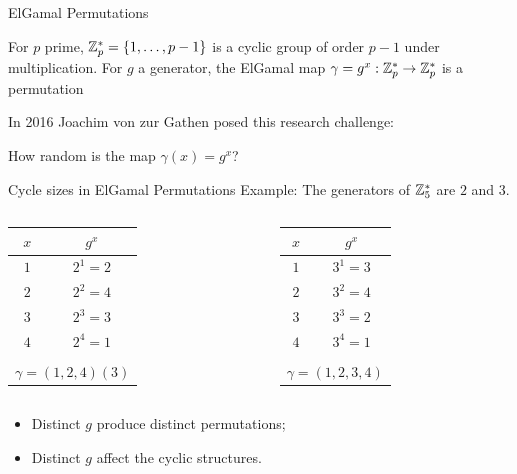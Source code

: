 

\begin{frame}{ElGamal Permutations}

For $p$ prime, $\mathbb{Z}_p^* = \{1, \ldots, p-1\}$ is a cyclic group of order $p-1$ under multiplication. For $g$ a generator, the ElGamal map $\gamma = g^x: \mathbb{Z}_p^* \rightarrow \mathbb{Z}_p^*$ is a permutation
\vspace{1cm}

In 2016 Joachim von zur Gathen posed this research challenge:

\begin{center}
  {\Large
How random is the map $\gamma(x) = g^x$?}
\end{center}

\end{frame}




\begin{frame}{Cycle sizes in ElGamal Permutations}
Example: The generators of $\mathbb{Z}_5^*$ are  $2$ and $3$.

    \begin{columns}
        \begin{column}{0.45\textwidth}
        \centering
    	    \begin{tabular}{c|c}
    	        $x$ & $g^{x} $ \\ \hline \hline
    	        $1$ & $2^{1} = 2$ \\
    	        $2$ & $2^{2} = 4$ \\
    	        $3$ & $2^{3} = 3$ \\
              $4$ & $2^{4} = 1$  \\
                \multicolumn{2}{c}{} \\
              \multicolumn{2}{c}{$\gamma = (1,2,4)(3)$}
    	    \end{tabular}
        \end{column}
        \begin{column}{0.45\textwidth}
    	    \centering
    	    \begin{tabular}{c|c}
    	        $x$ & $g^{x} $ \\ \hline \hline
    	        $1$ & $3^{1} = 3$ \\
    	        $2$ & $3^{2} = 4$ \\
    	        $3$ & $3^{3} = 2$ \\
    	        $4$ & $3^{4} = 1$  \\
                \multicolumn{2}{c}{} \\
              \multicolumn{2}{c}{$\gamma  = (1,2,3,4)$}
    	    \end{tabular}
        \end{column}
  \end{columns}
  
  \pause
  \begin{itemize}
      \item Distinct $g$ produce distinct permutations;
      \item Distinct $g$ affect the cyclic structures.
  \end{itemize}
  
\end{frame}

